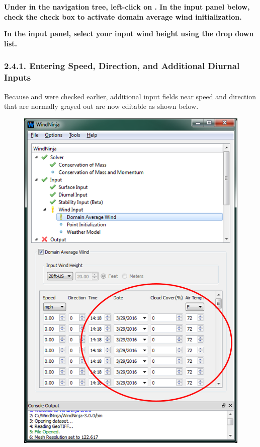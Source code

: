 \documentclass[12pt]{article}
\begin{document}
\textbf{\color{red} Under  in the navigation tree, left-click on .  In the input panel below, check the  check box to activate domain average wind initialization.}


\textbf{\color{red} In the input panel, select your input wind height using the  drop down list.}

\subsubsection{2.4.1. Entering Speed, Direction, and Additional Diurnal Inputs}

Because  and  were checked earlier, additional input fields near speed and direction that are normally grayed out are now editable as shown below.

\begin{figure}[H]
	\centering
	\label{}
	\includegraphics[scale=1.0]{imgs/domain_avg_1.png}
\end{figure}
\end{document}
